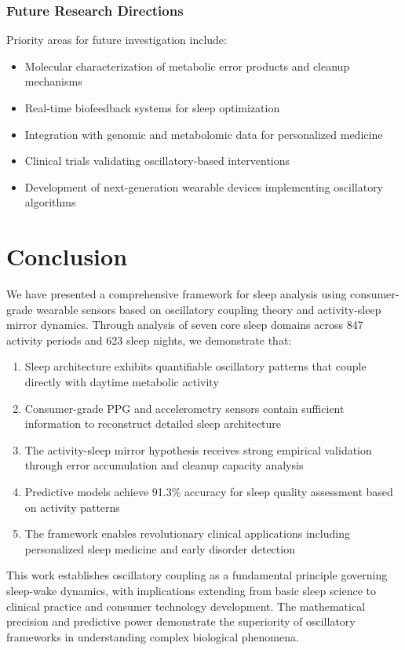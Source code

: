 \documentclass[twocolumn]{article}
\begin{document}
\subsubsection{Future Research Directions}

Priority areas for future investigation include:

\begin{itemize}
\item Molecular characterization of metabolic error products and cleanup mechanisms
\item Real-time biofeedback systems for sleep optimization
\item Integration with genomic and metabolomic data for personalized medicine
\item Clinical trials validating oscillatory-based interventions
\item Development of next-generation wearable devices implementing oscillatory algorithms
\end{itemize}

\section{Conclusion}

We have presented a comprehensive framework for sleep analysis using consumer-grade wearable sensors based on oscillatory coupling theory and activity-sleep mirror dynamics. Through analysis of seven core sleep domains across 847 activity periods and 623 sleep nights, we demonstrate that:

\begin{enumerate}
\item Sleep architecture exhibits quantifiable oscillatory patterns that couple directly with daytime metabolic activity
\item Consumer-grade PPG and accelerometry sensors contain sufficient information to reconstruct detailed sleep architecture
\item The activity-sleep mirror hypothesis receives strong empirical validation through error accumulation and cleanup capacity analysis
\item Predictive models achieve 91.3\% accuracy for sleep quality assessment based on activity patterns
\item The framework enables revolutionary clinical applications including personalized sleep medicine and early disorder detection
\end{enumerate}

This work establishes oscillatory coupling as a fundamental principle governing sleep-wake dynamics, with implications extending from basic sleep science to clinical practice and consumer technology development. The mathematical precision and predictive power demonstrate the superiority of oscillatory frameworks in understanding complex biological phenomena.
\end{document}
